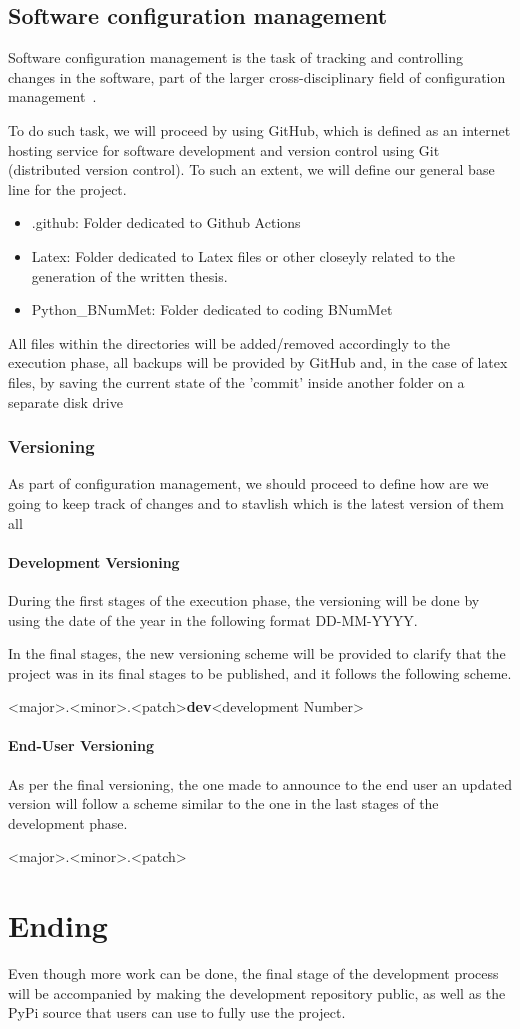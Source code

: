 \subsection{Software configuration management}
Software configuration management is the task of tracking and controlling changes in the software, part of the larger cross-disciplinary field of configuration management~\cite{Pre94}.

To do such task, we will proceed by using GitHub, which is defined as an internet hosting service for software development and version control using Git (distributed version control). To such an extent, we will define our general base line for the project.
\begin{itemize}
    \item .github: Folder dedicated to Github Actions
    \item Latex: Folder dedicated to Latex files or other closeyly related to the generation of the written thesis.
    \item Python\_BNumMet: Folder dedicated to coding BNumMet
\end{itemize}

All files within the directories will be added/removed accordingly to the execution phase, all backups will be provided by GitHub and, in the case of latex files, by saving the current state of the 'commit' inside another folder on a separate disk drive
\subsubsection{Versioning}
As part of configuration management, we should proceed to define how are we going to keep track of changes and to stavlish which is the latest version of them all
\paragraph{Development Versioning}
During the first stages of the execution phase, the versioning will be done by using the date of the year in the following format DD-MM-YYYY.

In the final stages, the new versioning scheme will be provided to clarify that the project was in its final stages to be published, and it follows the following scheme.
\begin{center}
    <major>.<minor>.<patch>\textbf{dev}<development Number>
\end{center}
\paragraph{End-User Versioning}
As per the final versioning, the one made to announce to the end user an updated version will follow a scheme similar to the one in the last stages of the development phase.
\begin{center}
    <major>.<minor>.<patch>
\end{center}



\section{Ending}
Even though more work can be done, the final stage of the development process will be accompanied by making the development repository public, as well as the PyPi source that users can use to fully use the project. 

